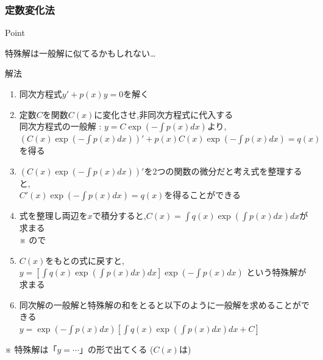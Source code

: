 \documentclass[a4paper]{jsarticle}
\begin{document}
\subsubsection{定数変化法}
\begin{itembox}[l]{Point}
    \begin{center}
        特殊解は一般解に似てるかもしれない\dots
    \end{center}
\end{itembox}
\begin{itembox}[l]{解法}
    \begin{enumerate}[(1)]
        \item 同次方程式$y'+p\left(x\right)y=0$を解く
        \item 定数$C$を関数$C\left(x\right)$に変化させ,非同次方程式に代入する\\
              同次方程式の一般解 : $y=C\exp\left(-\int p\left(x\right)dx\right)$より,\\
              $\left(C\left(x\right)\exp\left(-\int p\left(x\right)dx\right)\right)'+p\left(x\right)C\left(x\right)\exp\left(-\int p\left(x\right)dx\right)=q\left(x\right)$を得る
        \item $\left(C\left(x\right)\exp\left(-\int p\left(x\right)dx\right)\right)'$を2つの関数の微分だと考え式を整理すると,\\
              $C'\left(x\right)\exp\left(-\int p\left(x\right)dx\right)=q\left(x\right)$を得ることができる
        \item 式を整理し両辺を$x$で積分すると,$C\left(x\right)=\int q\left(x\right)\exp\left(\int p\left(x\right)dx\right)dx$が求まる\\
              ※ ので
        \item $C\left(x\right)$をもとの式に戻すと,$y=\left[\int q\left(x\right)\exp\left(\int p\left(x\right)dx\right)dx\right]\exp\left(-\int p\left(x\right)dx\right)$
              という特殊解が求まる
        \item 同次解の一般解と特殊解の和をとると以下のように一般解を求めることができる\\
              $y=\exp\left(-\int p\left(x\right)dx\right)\left[\int q\left(x\right)\exp\left(\int p\left(x\right)dx\right)dx+C\right]$
    \end{enumerate}
\end{itembox}
※ 特殊解は「$y=\cdots$」の形で出てくる ($C\left(x\right)$は)\\
\end{document}

